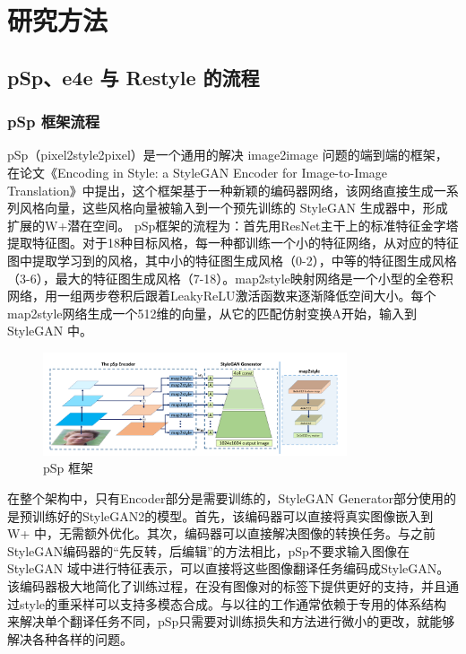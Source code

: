 \chapter{研究方法}
\label{chap:3}

\section{pSp、e4e 与 Restyle 的流程}

\subsection{pSp 框架流程}

pSp（pixel2style2pixel）是一个通用的解决 image2image 问题的端到端的框架，在论文《Encoding in Style: a StyleGAN Encoder for Image-to-Image Translation》中提出，这个框架基于一种新颖的编码器网络，该网络直接生成一系列风格向量，这些风格向量被输入到一个预先训练的 StyleGAN 生成器中，形成扩展的W+潜在空间。
pSp框架的流程为：首先用ResNet主干上的标准特征金字塔提取特征图。对于18种目标风格，每一种都训练一个小的特征网络，从对应的特征图中提取学习到的风格，其中小的特征图生成风格（0-2），中等的特征图生成风格（3-6），最大的特征图生成风格（7-18）。map2style映射网络是一个小型的全卷积网络，用一组两步卷积后跟着LeakyReLU激活函数来逐渐降低空间大小。每个map2style网络生成一个512维的向量，从它的匹配仿射变换A开始，输入到 StyleGAN 中。
 
 \begin{figure}[htb]
\centering 
\includegraphics[width=0.8\textwidth]{img/m3p1.png} 
\caption{pSp 框架}
\label{Test}
\end{figure}
 
在整个架构中，只有Encoder部分是需要训练的，StyleGAN Generator部分使用的是预训练好的StyleGAN2的模型。首先，该编码器可以直接将真实图像嵌入到 W+ 中，无需额外优化。其次，编码器可以直接解决图像的转换任务。与之前StyleGAN编码器的“先反转，后编辑”的方法相比，pSp不要求输入图像在 StyleGAN 域中进行特征表示，可以直接将这些图像翻译任务编码成StyleGAN。该编码器极大地简化了训练过程，在没有图像对的标签下提供更好的支持，并且通过style的重采样可以支持多模态合成。与以往的工作通常依赖于专用的体系结构来解决单个翻译任务不同，pSp只需要对训练损失和方法进行微小的更改，就能够解决各种各样的问题。

